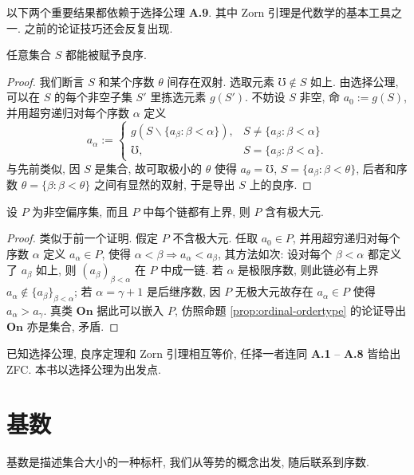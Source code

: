 以下两个重要结果都依赖于选择公理 \textbf{A.9}. 其中 Zorn 引理是代数学的基本工具之一. 之前的论证技巧还会反复出现.
\begin{theorem}\label{prop:wellorder-principle}
	任意集合 $S$ 都能被赋予良序.
\end{theorem}
\begin{proof}
	我们断言 $S$ 和某个序数 $\theta$ 间存在双射. 选取元素 $\mho \notin S$ 如上. 由选择公理, 可以在 $S$ 的每个非空子集 $S'$ 里拣选元素 $g(S')$. 不妨设 $S$ 非空, 命 $a_0 := g(S)$, 并用超穷递归对每个序数 $\alpha$ 定义
	\[ a_\alpha := \begin{cases}
		g \left( S \smallsetminus \{ a_\beta : \beta < \alpha \} \right), & S \neq \{ a_\beta : \beta < \alpha \} \\
		\mho, & S = \{ a_\beta : \beta < \alpha \}.
	\end{cases}\]
	与先前类似, 因 $S$ 是集合, 故可取极小的 $\theta$ 使得 $a_\theta = \mho$, $S = \{a_\beta: \beta < \theta\}$, 后者和序数 $\theta = \{\beta : \beta < \theta \}$ 之间有显然的双射, 于是导出 $S$ 上的良序.
\end{proof}

\begin{theorem}[Zorn 引理]\label{prop:Zorn}
	设 $P$ 为非空偏序集, 而且 $P$ 中每个链都有上界, 则 $P$ 含有极大元.
\end{theorem}
\begin{proof}
	类似于前一个证明. 假定 $P$ 不含极大元. 任取 $a_0 \in P$, 并用超穷递归对每个序数 $\alpha$ 定义 $a_\alpha \in P$, 使得 $\alpha < \beta \Rightarrow a_\alpha < a_\beta$, 其方法如次: 设对每个 $\beta < \alpha$ 都定义了 $a_\beta$ 如上, 则 $(a_\beta)_{\beta < \alpha}$ 在 $P$ 中成一链. 若 $\alpha$ 是极限序数, 则此链必有上界 $a_\alpha \notin \{ a_\beta \}_{\beta < \alpha}$; 若 $\alpha = \gamma + 1$ 是后继序数, 因 $P$ 无极大元故存在 $a_\alpha \in P$ 使得 $a_\alpha > a_\gamma$. 真类 $\textbf{On}$ 据此可以嵌入 $P$, 仿照命题 \ref{prop:ordinal-ordertype} 的论证导出 $\textbf{On}$ 亦是集合, 矛盾.
\end{proof}
已知选择公理, 良序定理和 Zorn 引理相互等价, 任择一者连同 \textbf{A.1} -- \textbf{A.8} 皆给出 ZFC. 本书以选择公理为出发点.

\section{基数}\label{sec:cardinal-number}
基数是描述集合大小的一种标杆, 我们从等势的概念出发, 随后联系到序数.

